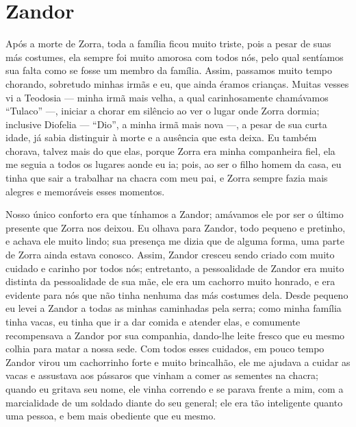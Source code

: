 \cleardoublepage
\newpage
{}
\chapter{Zandor}

Após a morte de Zorra, toda a família ficou muito triste, pois a pesar de suas más costumes, ela sempre foi muito amorosa com todos nós, pelo qual sentíamos sua falta como se fosse um membro da família. 
Assim, passamos muito tempo chorando, sobretudo minhas irmãs e eu, que ainda éramos crianças. 
Muitas vesses vi a Teodosia ---  minha irmã mais velha, a qual carinhosamente chamávamos ``Tulaco'' ---, iniciar a chorar em silêncio ao ver o lugar onde Zorra dormia; inclusive Diofelia  --- ``Dio'', a minha irmã mais nova ---, a pesar de sua curta idade, já sabia distinguir à morte e a ausência que esta deixa. 
Eu também chorava, talvez mais do que elas, porque Zorra era minha companheira fiel, ela me seguia a todos os lugares aonde eu ia; pois, ao ser o filho homem da casa, eu tinha que sair a trabalhar na chacra com meu pai, e Zorra sempre fazia mais alegres e memoráveis esses momentos.

Nosso único conforto era que tínhamos a Zandor; amávamos ele por ser o último presente que Zorra nos deixou.
Eu olhava para Zandor, todo pequeno e pretinho, e achava ele muito lindo; sua presença me dizia que de alguma forma, uma parte de Zorra ainda estava conosco. 
Assim, Zandor cresceu sendo criado com muito cuidado e carinho por todos nós;
entretanto, a pessoalidade de Zandor era muito distinta da pessoalidade de sua mãe, ele era um cachorro muito honrado, e era evidente para nós que não tinha nenhuma das más costumes dela. 
Desde pequeno eu levei a Zandor a todas as minhas caminhadas pela serra; como minha família tinha vacas, eu tinha que ir a dar comida e atender elas, e comumente recompensava a Zandor por sua companhia, dando-lhe leite fresco que eu mesmo colhia para matar a nossa sede. 
Com todos esses cuidados, em pouco tempo Zandor virou um cachorrinho forte e muito brincalhão,
ele me ajudava a cuidar as vacas e assustava aos pássaros que vinham a comer as sementes na chacra; quando eu gritava seu nome, ele vinha correndo e se parava frente a mim, com a marcialidade de um soldado diante do seu general; ele era tão inteligente quanto uma pessoa, e bem mais obediente que eu mesmo.

